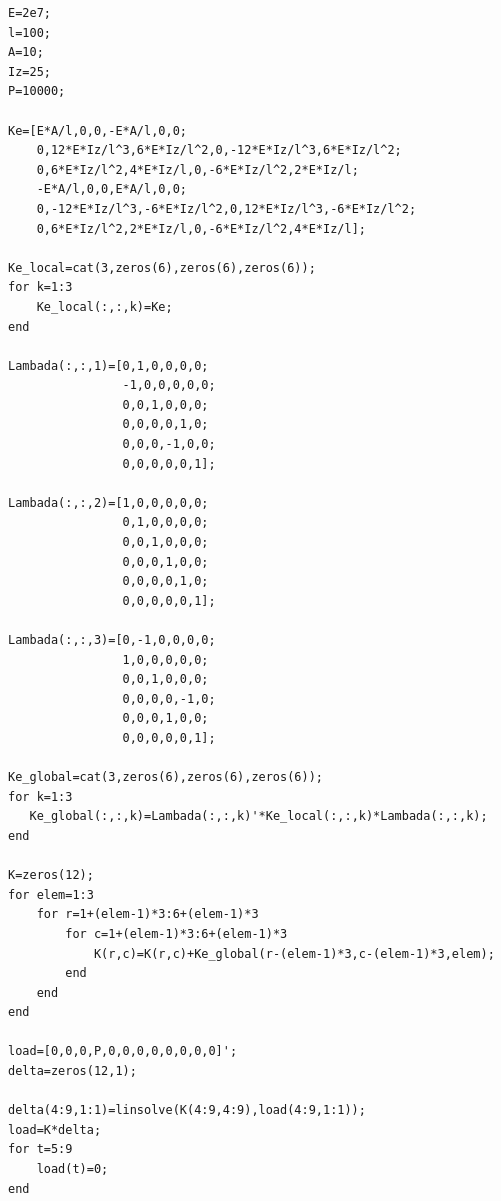 \documentclass[UTF8]{ctexart}
\begin{document}
\begin{verbatim}
E=2e7;
l=100;
A=10;
Iz=25;
P=10000;

Ke=[E*A/l,0,0,-E*A/l,0,0;
    0,12*E*Iz/l^3,6*E*Iz/l^2,0,-12*E*Iz/l^3,6*E*Iz/l^2;
    0,6*E*Iz/l^2,4*E*Iz/l,0,-6*E*Iz/l^2,2*E*Iz/l;
    -E*A/l,0,0,E*A/l,0,0;
    0,-12*E*Iz/l^3,-6*E*Iz/l^2,0,12*E*Iz/l^3,-6*E*Iz/l^2;
    0,6*E*Iz/l^2,2*E*Iz/l,0,-6*E*Iz/l^2,4*E*Iz/l];

Ke_local=cat(3,zeros(6),zeros(6),zeros(6));
for k=1:3
    Ke_local(:,:,k)=Ke;
end

Lambada(:,:,1)=[0,1,0,0,0,0;
                -1,0,0,0,0,0;
                0,0,1,0,0,0;
                0,0,0,0,1,0;
                0,0,0,-1,0,0;
                0,0,0,0,0,1];

Lambada(:,:,2)=[1,0,0,0,0,0;
                0,1,0,0,0,0;
                0,0,1,0,0,0;
                0,0,0,1,0,0;
                0,0,0,0,1,0;
                0,0,0,0,0,1];

Lambada(:,:,3)=[0,-1,0,0,0,0;
                1,0,0,0,0,0;
                0,0,1,0,0,0;
                0,0,0,0,-1,0;
                0,0,0,1,0,0;
                0,0,0,0,0,1];

Ke_global=cat(3,zeros(6),zeros(6),zeros(6));
for k=1:3
   Ke_global(:,:,k)=Lambada(:,:,k)'*Ke_local(:,:,k)*Lambada(:,:,k);
end

K=zeros(12);
for elem=1:3
    for r=1+(elem-1)*3:6+(elem-1)*3
        for c=1+(elem-1)*3:6+(elem-1)*3
            K(r,c)=K(r,c)+Ke_global(r-(elem-1)*3,c-(elem-1)*3,elem);
        end
    end
end

load=[0,0,0,P,0,0,0,0,0,0,0,0]';
delta=zeros(12,1);

delta(4:9,1:1)=linsolve(K(4:9,4:9),load(4:9,1:1));
load=K*delta;
for t=5:9
    load(t)=0;
end
\end{verbatim}
\end{document}
